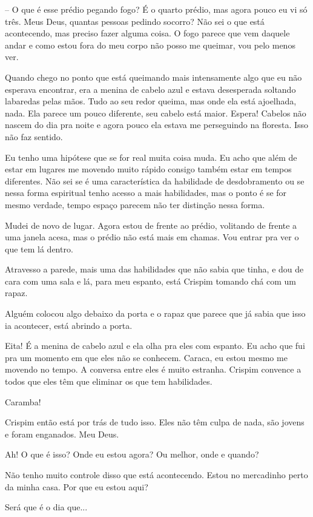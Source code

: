 -- O que é esse prédio pegando fogo? 
É o quarto prédio, mas agora pouco eu vi só três. Meus Deus, quantas pessoas pedindo socorro? Não sei o que está acontecendo, mas preciso fazer alguma coisa. O fogo parece que vem daquele andar e como estou fora do meu corpo não posso me queimar, vou pelo menos ver.

Quando chego no ponto que está queimando mais intensamente algo que eu não esperava encontrar, era a menina de cabelo azul e estava desesperada soltando labaredas pelas mãos. Tudo ao seu redor queima, mas onde ela está ajoelhada, nada.
Ela parece um pouco diferente, seu cabelo está maior. 
Espera! Cabelos não nascem do dia pra noite e agora pouco ela estava me perseguindo na floresta. Isso não faz sentido.

Eu tenho uma hipótese que se for real muita coisa muda. Eu acho que além de estar em lugares me movendo muito rápido consigo também estar em tempos diferentes. Não sei se é uma característica da habilidade de desdobramento ou se nessa forma espiritual tenho acesso a mais habilidades, mas o ponto é se for mesmo verdade, tempo espaço parecem não ter distinção nessa forma.

Mudei de novo de lugar. Agora estou de frente ao prédio, volitando de frente a uma janela acesa, mas o prédio não está mais em chamas. Vou entrar pra ver o que tem lá dentro.

Atravesso a parede, mais uma das habilidades que não sabia que tinha, e dou de cara com uma sala e lá, para meu espanto, está Crispim tomando chá com um rapaz.

Alguém colocou algo debaixo da porta e o rapaz que parece que já sabia que isso ia acontecer, está abrindo a porta.

Eita! É a menina de cabelo azul e ela olha pra eles com espanto. Eu acho que fui pra um momento em que eles não se conhecem. Caraca, eu estou mesmo me movendo no tempo.
A conversa entre eles é muito estranha. Crispim convence a todos que eles têm que eliminar os que tem habilidades.

Caramba!

Crispim então está por trás de tudo isso. Eles não têm culpa de nada, são jovens e foram enganados. Meu Deus.

Ah! O que é isso?
Onde eu estou agora?
Ou melhor, onde e quando?

Não tenho muito controle disso que está acontecendo. 
Estou no mercadinho perto da minha casa. Por que eu estou aqui?

Será que é o dia que...

